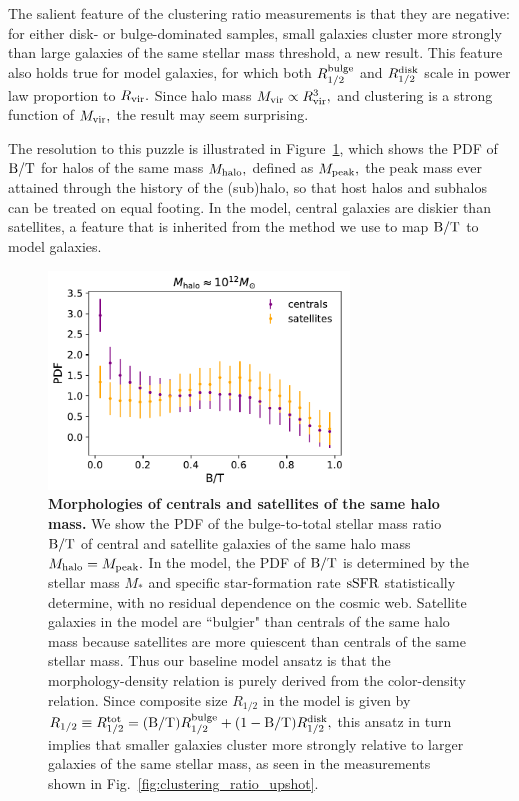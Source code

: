 \documentclass[usenatbib,usegraphicx,letterpaper]{mn2e}
\newcommand{\rhalf}{R_{1/2}}
\newcommand{\rhalftot}{R^{\rm tot}_{1/2}}
\newcommand{\rhalfdisk}{R_{1/2}^{\rm disk}}
\newcommand{\rhalfbulge}{R_{1/2}^{\rm bulge}}
\newcommand{\rvir}{R_{\rm vir}}
\newcommand{\bt}{{\rm B/T}}
\newcommand{\mstar}{M_{\ast}}
\newcommand{\ssfr}{{\rm sSFR}}
\newcommand{\mvir}{M_{\rm vir}}
\newcommand{\mpeak}{M_{\rm peak}}
\newcommand{\mhalo}{M_{\rm halo}}
\begin{document}
The salient feature of the clustering ratio measurements is that they are negative: for either disk- or bulge-dominated samples, small galaxies cluster more strongly than large galaxies of the same stellar mass threshold, a new result. This feature also holds true for model galaxies, for which both $\rhalfbulge$ and $\rhalfdisk$ scale in power law proportion to $\rvir.$ Since halo mass $\mvir\propto\rvir^{3},$ and clustering is a strong function of $\mvir,$ the result may seem surprising.

The resolution to this puzzle is illustrated in Figure~\ref{fig:bt_censat}, which shows the PDF of $\bt$ for halos of the same mass $\mhalo,$ defined as $\mpeak,$ the peak mass ever attained through the history of the (sub)halo, so that host halos and subhalos can be treated on equal footing. In the model, central galaxies are diskier than satellites, a feature that is inherited from the method we use to map $\bt$ to model galaxies.

\begin{figure}
\centering
\includegraphics[width=8cm]{FIGS/random_bt_centrals_vs_satellites.pdf}
\caption{
{\bf Morphologies of centrals and satellites of the same halo mass.} We show the PDF of the bulge-to-total stellar mass ratio $\bt$ of central and satellite galaxies of the same halo mass $\mhalo=\mpeak.$ In the model, the PDF of $\bt$ is determined by the stellar mass $\mstar$ and specific star-formation rate $\ssfr$ statistically determine, with no residual dependence on the cosmic web. Satellite galaxies in the model are ``bulgier" than centrals of the same halo mass because satellites are more quiescent than centrals of the same stellar mass. Thus our baseline model ansatz is that the morphology-density relation is purely derived from the color-density relation. Since composite size $\rhalf$ in the model is given by $\rhalf\equiv\rhalftot=(\bt)\rhalfbulge + (1-\bt)\rhalfdisk,$ this ansatz in turn implies that smaller galaxies cluster more strongly relative to larger galaxies of the same stellar mass, as seen in the measurements shown in Fig.~\ref{fig:clustering_ratio_upshot}.
}
\label{fig:bt_censat}
\end{figure}
\end{document}

